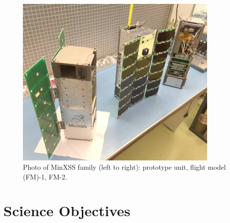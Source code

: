 \begin{figure}[!h]
    \begin{center}
	    \includegraphics[width=100mm]{Images/MinXSSFamily.png}
    \end{center}
    \caption[Photo of 3 MinXSS CubeSat models]{
        Photo of MinXSS family (left to right): prototype unit, flight model (FM)-1, FM-2. 
    }
    \label{fig:minxssfamily}
\end{figure}

\section{Science Objectives}

